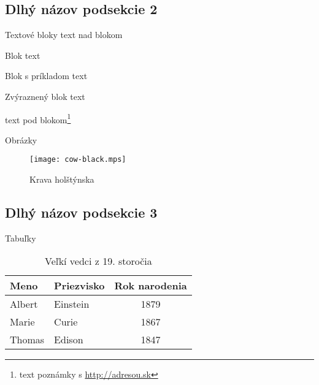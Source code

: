 \documentclass[
]{beamer}
\begin{document}
\subsection[Názov podsekcie 2]{Dlhý názov podsekcie 2}

\begin{frame}{Textové bloky}
text nad blokom
\begin{block}{Blok}
  text
\end{block}
\begin{exampleblock}{Blok s príkladom}
  text
\end{exampleblock}
\begin{alertblock}{Zvýraznený blok}
  text
\end{alertblock}
text pod blokom\footnote{text poznámky s \url{http://adresou.sk}}
\end{frame}

\begin{frame}{Obrázky}
\begin{figure}
  \texttt{[image: cow-black.mps]}
  \caption{Krava holštýnska}
\end{figure}
\end{frame}

\subsection[Názov podsekcie 3]{Dlhý názov podsekcie 3}

\begin{frame}{Tabuľky}
\begin{table}
  \begin{tabular}{llc}
    Meno & Priezvisko & Rok narodenia \\ \midrule
    Albert & Einstein & 1879 \\
    Marie & Curie & 1867 \\
    Thomas & Edison & 1847 \\
  \end{tabular}
  \caption{Veľkí vedci z 19. storočia}
\end{table}
\end{frame}
\end{document}
